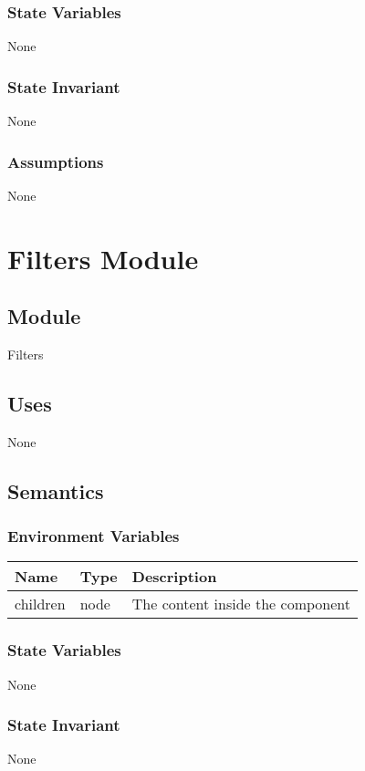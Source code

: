\documentclass[12pt]{article}
\begin{document}
\subsubsection{State Variables}
None

\subsubsection{State Invariant}
None

\subsubsection{Assumptions}
None

\newpage


\section{Filters Module}

\subsection{Module}
Filters

\subsection{Uses}
None

\subsection{Semantics}

\subsubsection{Environment Variables}
\begin{tabular}{| l | l | p{10cm} |}
    \hline
    \textbf{Name} & \textbf{Type} & \textbf{Description}\\ \hline
    children & node & The content inside the component\\ \hline
\end{tabular}

\subsubsection{State Variables}
None

\subsubsection{State Invariant}
None
\end{document}
